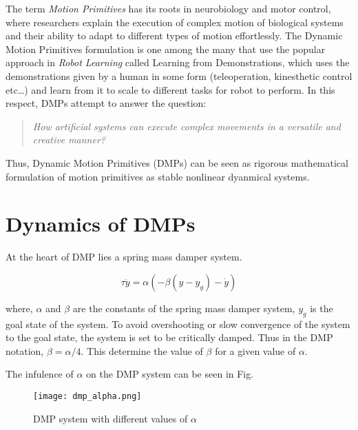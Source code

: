 The term \textit{Motion Primitives} has its roots in neurobiology and motor control, where researchers
explain the execution of complex motion of biological systems and their ability to adapt to different types of motion effortlessly.
The Dynamic Motion Primitives formulation is one among the many that use the popular approach in \textit{Robot Learning} called Learning from Demonstrations, which uses the demonstrations given by a 
human in some form (teleoperation, kinesthetic control etc\dots) and learn from it to scale to different tasks for robot to perform.
In this respect, DMPs attempt to answer the question:

\begin{quote}
    \centering
    \textit{How artificial systems can execute
complex movements in a versatile and creative manner?\cite{saveriano2021dynamic}}
\end{quote}

Thus, Dynamic Motion Primitives (DMPs) can be seen as rigorous mathematical formulation of motion primitives as stable nonlinear dyanmical systems.

\section{Dynamics of DMPs}

At the heart of DMP lies a spring mass damper system.

\begin{equation}
    \tau \ddot{y} = \alpha \left( -\beta \left( y - y_g \right) - \dot{y} \right)
    \label{eq:dmp_equation}
\end{equation}

where, $\alpha$ and $\beta$ are the constants of the spring mass damper system, $y_g$ is the goal state of the system. To avoid overshooting or slow convergence of the system to the goal state,
the system is set to be critically damped. Thus in the DMP notation, $\beta=\alpha/4$. This determine the value of $\beta$ for a given value of $\alpha$.

The infulence of $\alpha$ on the DMP system can be seen in Fig.

\begin{figure}[h]
    \centering
    \texttt{[image: dmp\_alpha.png]}
    \caption{DMP system with different values of $\alpha$} %
\end{figure}

